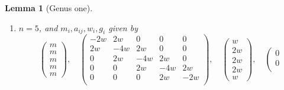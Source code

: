 \documentclass{stacks-project}
\theoremstyle{plain}
\newtheorem{lemma}[subsection]{Lemma}
\theoremstyle{definition}
\theoremstyle{remark}
\numberwithin{equation}{subsection}
\begin{document}
\begin{lemma}[Genus one]
\begin{enumerate}
$$\begin{matrix}
2m \\
2m \\
m
\end{matrix}
\right),
\quad
\left(
\begin{matrix}
-2w & 2w & 0 & 0 & 0 \\
2w & -4w & 2w & 0 & 0 \\
0 & 2w & -4w & 2w & 0 \\
0 & 0 & 2w & -4w & 4w \\
0 & 0 & 0 & 4w & -8w \\
\end{matrix}
\right),
\quad
\left(
\begin{matrix}
w \\
2w \\
2w \\
2w \\
4w
\end{matrix}
\right),
\quad
\left(
\begin{matrix}
0 \\
0 \\
0 \\
0 \\
0
\end{matrix}
\right)
$$
with $w$ and $m$ arbitrary,
\item
\label{item-up-equal-equal-down}
$n = 5$, and $m_i, a_{ij}, w_i, g_i$ given by
$$
\left(
\begin{matrix}
m \\
m \\
m \\
m \\
m
\end{matrix}
\right),
\quad
\left(
\begin{matrix}
-2w & 2w & 0 & 0 & 0 \\
2w & -4w & 2w & 0 & 0 \\
0 & 2w & -4w & 2w & 0 \\
0 & 0 & 2w & -4w & 2w \\
0 & 0 & 0 & 2w & -2w \\
\end{matrix}
\right),
\quad
\left(
\begin{matrix}
w \\
2w \\
2w \\
2w \\
w
\end{matrix}
\right),
\quad
\left(
\begin{matrix}
0 \\
0 \\

\end{matrix}$$
\end{enumerate}
\end{lemma}
\end{document}
